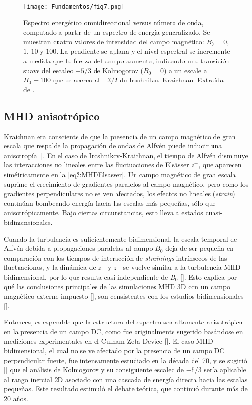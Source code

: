 \begin{figure}[h]
  \centering
  \texttt{[image: Fundamentos/fig7.png]}
  \caption{Espectro energético omnidireccional versus número de onda,
    computado a partir de un espectro de energía generalizado. Se
    muestran cuatro valores de
    intensidad del campo magnético: $B_0 = 0$, $1$, $10$ y $100$. La
    pendiente se aplana y el nivel espectral se incremente a medida que
    la fuerza del campo aumenta, indicando una transición suave del
    escaleo $-5/3$ de Kolmogorov ($B_0 = 0$) a un escale a $B_0 = 100$
    que se acerca al $-3/2$ de Iroshnikov-Kraichnan. Extraída de
    \cite{matthaeus_extended_1989}.}
  \label{fig:Omnidirectional_vs_k}
\end{figure}



\subsection{MHD anisotrópico}
Kraichnan era consciente de que la presencia de un campo magnético de
gran escala que respalde la propagación de ondas de Alfv\'en puede
inducir una anisotropía [\cite{galtier_weak_2000}]. En el caso de
Iroshnikov-Kraichnan, el tiempo de Alfv\'en disminuye las
interacciones no lineales entre las fluctuaciones de Els\"asser
$z^\pm$, que aparecen simétricamente en la \cref{eq2:MHDElsasser}. Un
campo magnético de gran escala suprime el crecimiento de gradientes
paralelos al campo magnético, pero como los gradientes perpendiculares
no se ven afectados, los efectos no lineales (\textit{strain})
continúan bombeando energía hacia las escalas más pequeñas, sólo que
anisotrópicamente. Bajo ciertas circunstancias, esto lleva a estados
cuasi-bidimensionales.

Cuando la turbulencia es suficientemente bidimensional, la escala
temporal de Alfv\'en debida a propagaciones paralelas al
campo $B_0$ deja de ser pequeña en comparación con los tiempos de
interacción de \textit{strainings} intrínsecos de las fluctuaciones, y
la dinámica de $z^+$ y $z^-$ se vuelve similar a la turbulencia MHD
bidimensional, por lo que resulta casi independiente de $B_0$
[\cite{chen_inhibition_1997, hossain_phenomenology_1995}]. Esto
explica por qué las conclusiones principales de las simulaciones MHD
3D con un campo magnético externo impuesto
[\cite{oughton_influence_1994}], son consistentes con los estudios
bidimensionales [\cite{shebalin_anisotropy_1983}].

Entonces, es esperable que la estructura del espectro sea altamente
anisotrópica en la presencia de un campo DC, como fue originalmente
sugerido basándose en mediciones experimentales en el Culham Zeta
Device [\cite{robinson_structure_1971}]. El caso MHD bidimensional, el
cual no se ve afectado por la presencia de un campo DC perpendicular
fuerte, fue intensamente estudiado en la década del 70, y se sugirió
[\cite{fyfe_high-beta_1976, fyfe_dissipative_1977}] que el análisis de
Kolmogorov y su consiguiente escaleo de $-5/3$ sería aplicable al
rango inercial 2D asociado con una cascada de energía directa hacia
las escalas pequeñas. Este resultado estimuló el debate teórico, que
continuó durante más de 20 años.

